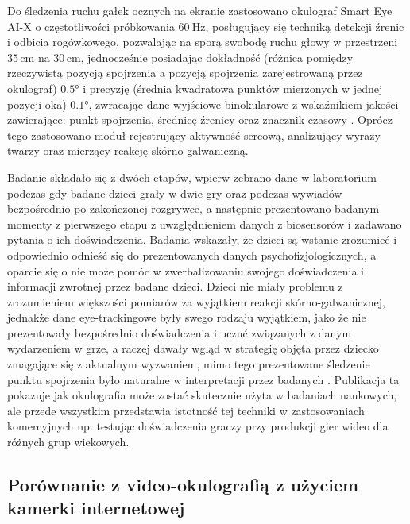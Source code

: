 \documentclass[a4paper,twoside,12pt]{book}
\begin{document}
Do śledzenia ruchu gałek ocznych na ekranie zastosowano okulograf Smart Eye AI-X o częstotliwości próbkowania $60 \ \unit{\hertz}$, posługujący się techniką detekcji źrenic i odbicia rogówkowego, pozwalając na sporą swobodę ruchu głowy w przestrzeni $35 \, \unit{\centi\metre}$ na $30 \, \unit{\centi\metre}$, jednocześnie posiadając dokładność (różnica pomiędzy rzeczywistą pozycją spojrzenia a pozycją spojrzenia zarejestrowaną przez okulograf) $\ang{0.5}$ i precyzję (średnia kwadratowa punktów mierzonych w jednej pozycji oka) $\ang{0.1}$, zwracając dane wyjściowe binokularowe z wskaźnikiem jakości zawierające: punkt spojrzenia, średnicę źrenicy oraz znacznik czasowy \cite{bib:iMotions-smart-eye-ai-x}. Oprócz tego zastosowano moduł rejestrujący aktywność sercową, analizujący wyrazy twarzy oraz mierzący reakcję skórno-galwaniczną. 

Badanie składało się z dwóch etapów, wpierw zebrano dane w laboratorium podczas gdy badane dzieci grały w dwie gry oraz podczas wywiadów bezpośrednio po zakończonej rozgrywce, a następnie prezentowano badanym momenty z pierwszego etapu z uwzględnieniem danych z biosensorów i zadawano pytania o ich doświadczenia. Badania wskazały, że dzieci są wstanie zrozumieć i odpowiednio odnieść się do prezentowanych danych psychofizjologicznych, a oparcie się o nie może pomóc w zwerbalizowaniu swojego doświadczenia i informacji zwrotnej przez badane dzieci. Dzieci nie miały problemu z zrozumieniem większości pomiarów za wyjątkiem reakcji skórno-galwanicznej, jednakże dane eye-trackingowe były swego rodzaju wyjątkiem, jako że nie prezentowały bezpośrednio doświadczenia i uczuć związanych z danym wydarzeniem w grze, a raczej dawały wgląd w strategię objęta przez dziecko zmagające się z aktualnym wyzwaniem, mimo tego prezentowane śledzenie punktu spojrzenia było naturalne w interpretacji przez badanych \cite{bib:iMotions-children}. Publikacja ta pokazuje jak okulografia może zostać skutecznie użyta w badaniach naukowych, ale przede wszystkim przedstawia istotność tej techniki w zastosowaniach komercyjnych np. testując doświadczenia graczy przy produkcji gier wideo dla różnych grup wiekowych.

\subsection{Porównanie z video-okulografią z użyciem kamerki internetowej}
\label{subsec:porownanie-z-video-okulografia-z-uzyciem-kamerki-internetowej}
\end{document}

